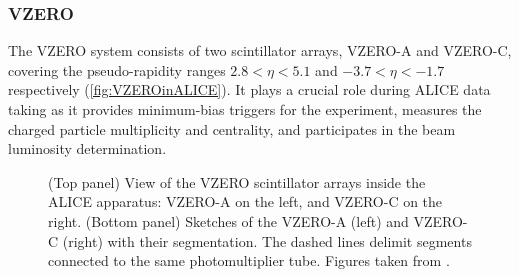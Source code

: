 \subsubsection{VZERO}
\label{subsubsec:VZERO}

The VZERO system consists of two scintillator arrays, VZERO-A and VZERO-C, covering the pseudo-rapidity ranges $2.8 < \eta < 5.1$ and $-3.7 < \eta < -1.7$ respectively (\fig\ref{fig:VZEROinALICE}). It plays a crucial role during ALICE data taking as it provides minimum-bias triggers for the experiment, measures the charged particle multiplicity and centrality, and participates in the beam luminosity determination.

\begin{figure}[h]
\centering
{}	
	\caption{(Top panel) View of the VZERO scintillator arrays inside the ALICE apparatus: VZERO-A on the left, and VZERO-C on the right. (Bottom panel) Sketches of the VZERO-A (left) and VZERO-C (right) with their segmentation. The dashed lines delimit segments connected to the same photomultiplier tube. Figures taken from \cite{alicecollaborationALICEExperimentJourney2022}\cite{alicecollaborationPerformanceALICEVZERO2013}.}
	\label{fig:VZEROdetector}
\end{figure}

